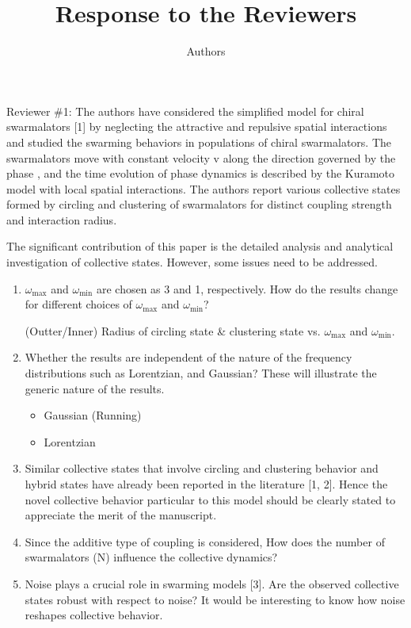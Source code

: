 \documentclass{article}
\title{\textbf{Response to the Reviewers}}
\author{Authors}
\begin{document}
\maketitle

Reviewer \#1: The authors have considered the simplified model for chiral swarmalators [1] by neglecting the attractive and repulsive spatial interactions and studied the swarming behaviors in populations of chiral swarmalators. The swarmalators move with constant velocity v along the direction governed by the phase , and the time evolution of phase dynamics is described by the Kuramoto model with local spatial interactions. The authors report various collective states formed by circling and clustering of swarmalators for distinct coupling strength and interaction radius.

The significant contribution of this paper is the detailed analysis and analytical investigation of collective states. However, some issues need to be addressed.

\begin{enumerate}
    \item $\omega_{\max}$ and $\omega_{\min}$ are chosen as 3 and 1, respectively. How do the results change for different choices of $\omega_{\max}$ and $\omega_{\min}$?
    
    (Outter/Inner) Radius of circling state \& clustering state vs. $\omega_{\max}$ and $\omega_{\min}$.

    \item Whether the results are independent of the nature of the frequency distributions such as Lorentzian, and Gaussian? These will illustrate the generic nature of the results.
    \begin{itemize}
        \item Gaussian (Running)
        \item Lorentzian
    \end{itemize}
    \item Similar collective states that involve circling and clustering behavior and hybrid states have already been reported in the literature [1, 2]. Hence the novel collective behavior particular to this model should be clearly stated to appreciate the merit of the manuscript.
    
    \item Since the additive type of coupling is considered, How does the number of swarmalators (N) influence the collective dynamics?
    
    \item Noise plays a crucial role in swarming models [3]. Are the observed collective states robust with respect to noise? It would be interesting to know how noise reshapes collective behavior.
\end{enumerate}
\end{document}
